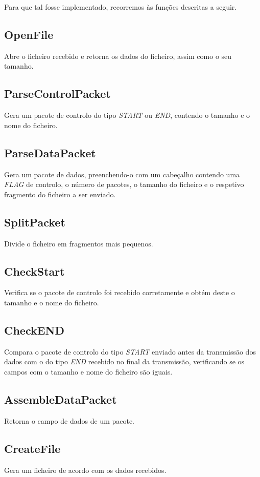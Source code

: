 \documentclass{article}
\begin{document}
Para que tal fosse implementado, recorremos às funções descritas a seguir.

\subsection{OpenFile}
Abre o ficheiro recebido e retorna os dados do ficheiro, assim como o seu tamanho.

\subsection{ParseControlPacket}
Gera um pacote de controlo do tipo \textit{START} ou \textit{END}, contendo o tamanho e o nome do ficheiro.

\subsection{ParseDataPacket}
Gera um pacote de dados, preenchendo-o com um cabeçalho contendo uma \textit{FLAG} de controlo, o número de pacotes, o tamanho do ficheiro e o respetivo fragmento do ficheiro a ser enviado.

\subsection{SplitPacket}
Divide o ficheiro em fragmentos mais pequenos.

\subsection{CheckStart}
Verifica se o pacote de controlo foi recebido corretamente e obtém deste o tamanho e o nome do ficheiro.

\subsection{CheckEND}
Compara o pacote de controlo do tipo \textit{START} enviado antes da transmissão dos dados com o do tipo \textit{END} recebido no final da transmissão, verificando se os campos com o tamanho e nome do ficheiro são iguais.

\subsection{AssembleDataPacket}
Retorna o campo de dados de um pacote.

\subsection{CreateFile}
Gera um ficheiro de acordo com os dados recebidos.
\end{document}

